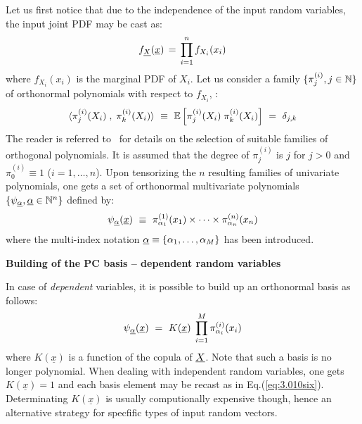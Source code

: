 {Let us first notice that due to the independence of the input random variables, the input joint PDF may be cast as:
\begin{equation}\label{eq:3.010qua}
	f_{\underline X}(\underline x) \, = \, \prod_{i=1}^{n} f_{X_i}(x_{i})
\end{equation}
where $f_{X_i}(x_{i})$ is the marginal PDF of $X_i$. Let us consider a family $\{\pi^{(i)}_{j}, j \in {\mathbb N}\}$ of orthonormal polynomials with respect to $f_{X_i}$, \ie:
\begin{equation}\label{eq:3.010cinq}
	\langle \pi^{(i)}_{j}(X_{i}) \; , \; \pi^{(i)}_{k}(X_{i}) \rangle  \, \, \equiv \, \, \mathbb{E}\left[ \pi^{(i)}_{j}(X_{i}) \;  \pi^{(i)}_{k}(X_{i}) \right] \, \, = \, \, \delta_{j,k}
\end{equation}
The reader is referred to~ for details on the selection of suitable families of orthogonal polynomials. It is assumed that the degree of $\pi^{(i)}_{j}$ is $j$ for $j>0$ and $\pi^{(i)}_{0} \equiv 1$ ($i=1,\dots,n$). Upon tensorizing the $n$ resulting families of univariate polynomials, one gets a set of orthonormal multivariate polynomials $\{\psi_{\underline{\alpha}} , \underline{\alpha} \in {\mathbb N}^n\}$ defined by:
\begin{equation}\label{eq:3.010six}
	\psi_{\underline{\alpha}}(\underline x) \, \, \equiv \,\, \pi^{(1)}_{\alpha_{1}}(x_{1}) \times \cdots \times \pi^{(n)}_{\alpha_{n}}(x_{n})
\end{equation}
where the multi-index notation $\underline{\alpha} \equiv \{\alpha_{1},\dots,\alpha_{M}\}$ has been introduced.%



\vspace{3mm}

\textbf{Building of the PC basis -- dependent random variables} \vspace{2mm}

In case of \emph{dependent} variables, it is possible to build up an orthonormal basis as follows:
\begin{equation}\label{eq:3.010six}
	\psi_{\underline{\alpha}}(\underline x) \, \, = \,\,  K(\underline{x}) \;\prod_{i=1}^M \pi^{(i)}_{\alpha_{i}}(x_{i}) 
\end{equation}
where $K(\underline{x})$ is a function of the copula of $\underline X$. Note that such a basis is no longer polynomial. When dealing with independent random variables, one gets $K(\underline{x})=1$ and each basis element may be recast as in Eq.(\ref{eq:3.010six}). Determinating $K(\underline{x})$ is usually computionally expensive though, hence an alternative strategy for specfific types of input random vectors. \\

}
